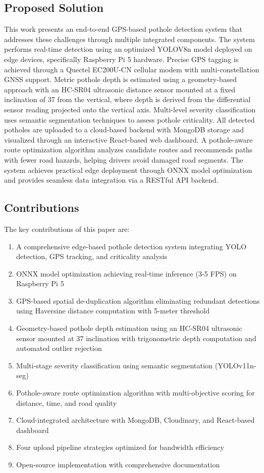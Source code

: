 \documentclass{ieeeaccess}
\begin{document}
\subsection{Proposed Solution}
This work presents an end-to-end GPS-based pothole detection system that addresses these challenges through multiple integrated components. The system performs real-time detection using an optimized YOLOV8n model deployed on edge devices, specifically Raspberry Pi 5 hardware. Precise GPS tagging is achieved through a Quectel EC200U-CN cellular modem with multi-constellation GNSS support. Metric pothole depth is estimated using a geometry-based approach with an HC-SR04 ultrasonic distance sensor mounted at a fixed inclination of 37\textdegree{} from the vertical, where depth is derived from the differential sensor reading projected onto the vertical axis. Multi-level severity classification uses semantic segmentation techniques to assess pothole criticality. All detected potholes are uploaded to a cloud-based backend with MongoDB storage and visualized through an interactive React-based web dashboard. A pothole-aware route optimization algorithm analyzes candidate routes and recommends paths with fewer road hazards, helping drivers avoid damaged road segments. The system achieves practical edge deployment through ONNX model optimization and provides seamless data integration via a RESTful API backend.

\subsection{Contributions}
The key contributions of this paper are:
\begin{enumerate}
    \item A comprehensive edge-based pothole detection system integrating YOLO detection, GPS tracking, and criticality analysis
    \item ONNX model optimization achieving real-time inference (3-5 FPS) on Raspberry Pi 5
    \item GPS-based spatial de-duplication algorithm eliminating redundant detections using Haversine distance computation with 5-meter threshold
    \item Geometry-based pothole depth estimation using an HC-SR04 ultrasonic sensor mounted at 37\textdegree{} inclination with trigonometric depth computation and automated outlier rejection
    \item Multi-stage severity classification using semantic segmentation (YOLOv11n-seg)
    \item Pothole-aware route optimization algorithm with multi-objective scoring for distance, time, and road quality
    \item Cloud-integrated architecture with MongoDB, Cloudinary, and React-based dashboard
    \item Four upload pipeline strategies optimized for bandwidth efficiency
    \item Open-source implementation with comprehensive documentation
\end{enumerate}
\end{document}
